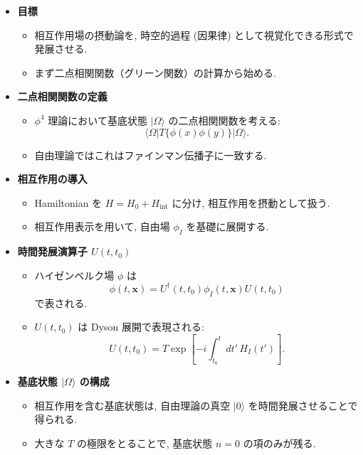 \documentclass[a4paper,12pt]{article}
\begin{document}
\begin{itemize}
  \item \textbf{目標}
  \begin{itemize}
    \item 相互作用場の摂動論を, 時空的過程 (因果律) として視覚化できる形式で発展させる.
    \item まず二点相関関数（グリーン関数）の計算から始める.
  \end{itemize}

  \item \textbf{二点相関関数の定義}
  \begin{itemize}
    \item $\phi^4$ 理論において基底状態 $\lvert \Omega \rangle$ の二点相関関数を考える:
    \begin{equation*}
      \langle \Omega | T\{\phi(x)\phi(y)\} | \Omega \rangle .
    \end{equation*}
    \item 自由理論ではこれはファインマン伝播子に一致する.
  \end{itemize}

  \item \textbf{相互作用の導入}
  \begin{itemize}
    \item Hamiltonian を $H = H_0 + H_{\text{int}}$ に分け, 相互作用を摂動として扱う.
    \item 相互作用表示を用いて, 自由場 $\phi_I$ を基礎に展開する.
  \end{itemize}

  \item \textbf{時間発展演算子 $U(t,t_0)$}
  \begin{itemize}
    \item ハイゼンベルク場 $\phi$ は
    \begin{equation*}
      \phi(t,\mathbf{x}) = U^\dagger(t,t_0)\phi_I(t,\mathbf{x})U(t,t_0)
    \end{equation*}
    で表される.
    \item $U(t,t_0)$ は Dyson 展開で表現される:
    \begin{equation*}
      U(t,t_0) = T \exp\left[ -i\int_{t_0}^t dt' \, H_I(t') \right].
    \end{equation*}
  \end{itemize}

  \item \textbf{基底状態 $\lvert \Omega \rangle$ の構成}
  \begin{itemize}
    \item 相互作用を含む基底状態は, 自由理論の真空 $\lvert 0 \rangle$ を時間発展させることで得られる.
    \item 大きな $T$ の極限をとることで, 基底状態 $n=0$ の項のみが残る.
  \end{itemize}


\end{itemize}
\end{document}

